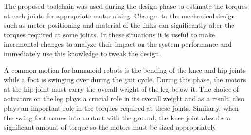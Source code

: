 The proposed toolchain was used during the design phase to estimate the torques at each joints for appropriate motor sizing. Changes to the mechanical design such as motor positioning and material of the links can significantly alter the torques required at some joints. In these situations it is useful to make incremental changes to analyze their impact on the system performance and immediately use this knowledge to tweak the design.

A common motion for humanoid robots is the bending of the knee and hip joints while a foot is swinging over during the gait cycle. During this phase, the motors at the hip joint must carry the overall weight of the leg below it. The choice of actuators on the leg plays a crucial role in its overall weight and as a result, also plays an important role in the torques required at these joints. Similarly, when the swing foot comes into contact with the ground, the knee joint absorbs a significant amount of torque so the motors must be sized appropriately.

